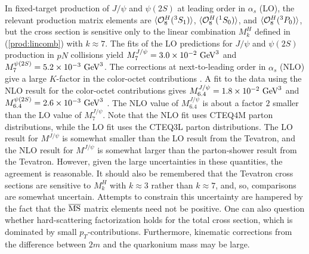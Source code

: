 In fixed-target production of $J/\psi$ and $\psi(2S)$ at
leading order in $\alpha_s$ (LO), the
relevant production matrix elements are 
$\langle{\cal O}^H_8({}^3S_1)\rangle$, $\langle{\cal O}^H_8({}^1S_0)\rangle$, 
and $\langle{\cal O}^H_8({}^3P_0)\rangle$, 
but the cross section is sensitive only to the linear combination 
$M^H_k$ defined in (\ref{prod:lincomb}) with $k\approx 7$. 
The fits of the LO predictions for $J/\psi$ and $\psi(2S)$
production in $pN$ collisions \cite{Beneke:1996tk} yield
$M_7^{J/\psi}=3.0\times 10^{-2}\hbox{~GeV}^3$ and
$M_7^{\psi(2S)}=5.2\times 10^{-3}\hbox{~GeV}^3$.
The corrections at next-to-leading order in $\alpha_s$ (NLO)
give a large $K$-factor in the
color-octet contributions \cite{Petrelli:1997ge}. A fit to the data
using the NLO result for the color-octet
contributions gives $M_{6.4}^{J/\psi}=1.8\times 10^{-2}\hbox{~GeV}^3$
and $M_{6.4}^{\psi(2S)}=2.6\times 10^{-3}\hbox{~GeV}^3$ 
\cite{Maltoni:2000km}.  The NLO value of $M_{6.4}^{J/\psi}$
is about a factor $2$ smaller than the LO value of $M_7^{J/\psi}$. Note
that the NLO fit uses CTEQ4M \cite{Lai:1996mg} parton distributions,
while the  LO fit uses the CTEQ3L \cite{Lai:1994bb} parton
distributions. The LO result for $M^{J/\psi}$ is somewhat smaller than
the LO result from the Tevatron, and the NLO result for $M^{J/\psi}$ is
somewhat larger than the parton-shower result from the Tevatron.
However, given the large uncertainties in these quantities, the
agreement is reasonable. It should also be remembered that the Tevatron
cross sections are sensitive to $M_k^H$ with $k \approx 3$ rather than
$k \approx 7$, and, so, comparisons are somewhat uncertain. Attempts to
constrain this uncertainty are hampered by the fact that the
$\overline{\rm MS}$ matrix elements need not be positive. One can also
question whether hard-scattering factorization holds for the total cross
section, which is dominated by small $p_T$-contributions. Furthermore,
kinematic corrections from the difference between $2m$ and the
quarkonium mass may be large.

